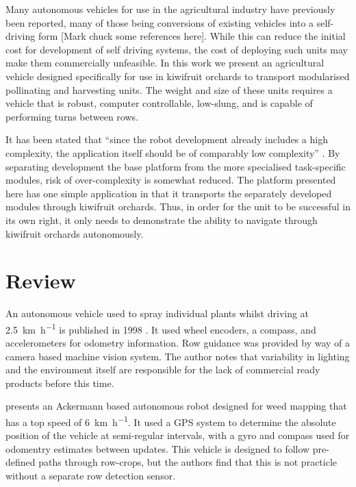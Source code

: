 \documentclass[preprint,authoryear,12pt]{elsarticle}
\begin{document}
    Many autonomous vehicles for use in the agricultural industry have previously been reported, many of those being conversions of existing vehicles into a self-driving form [Mark chuck some references here].
    While this can reduce the initial cost for development of self driving systems, the cost of deploying such units may make them commercially unfeasible.
    In this work we present an agricultural vehicle designed specifically for use in kiwifruit orchards to transport modularised pollinating and harvesting units.
    The weight and size of these units requires a vehicle that is robust, computer controllable, low-slung, and is capable of performing turns between rows.

    It has been stated that ``since the robot development already includes a high complexity, the application itself should be of comparably low complexity'' \citep{Ruckelshausen2009}.
    By separating development the base platform from the more specialised task-specific modules, risk of over-complexity is somewhat reduced.
    The platform presented here has one simple application in that it transports the separately developed modules through kiwifruit orchards.
    Thus, in order for the unit to be successful in its own right, it only needs to demonstrate the ability to navigate through kiwifruit orchards autonomously.

\section{Review}
\label{sect:review}
    
    An autonomous vehicle used to spray individual plants whilst driving at \SI{2.5}{\kilo\meter\per\hour} is published in 1998 \citep{Tillett1998}.
    It used wheel encoders, a compass, and accelerometers for odometry information.
    Row guidance was provided by way of a camera based machine vision system.
    The author notes that variability in lighting and the environment itself are responsible for the lack of commercial ready products before this time.
    

     presents an Ackermann based autonomous robot designed for weed mapping that has a top speed of \SI{6}{\kilo\meter\per\hour}.
    It used a GPS system to determine the absolute position of the vehicle at semi-regular intervals, with a gyro and compass used for odomentry estimates between updates.
    This vehicle is designed to follow pre-defined paths through row-crops, but the authors find that this is not practicle without a separate row detection sensor.
\end{document}
